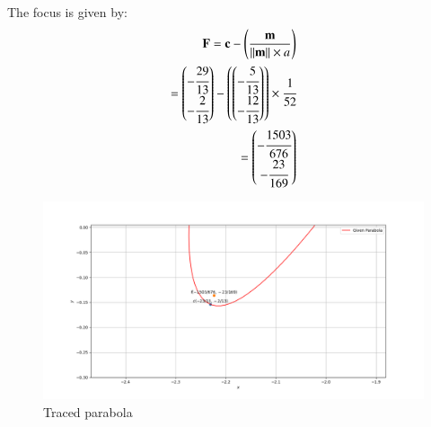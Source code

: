 \begin{enumerate}
The focus is given by:
\begin{align}
\mathbf{F}=\mathbf{c}-
\left(
\frac
{
\mathbf{m}
}
{
\left\lVert
\mathbf{m}
\right\rVert
\times a
}
\right)
\\
=\begin{pmatrix}
-\cfrac{29}{13}
\\
-\cfrac{2}{13}
\end{pmatrix}
-\begin{pmatrix}
\begin{pmatrix}
-\cfrac{5}{13}
\\
-\cfrac{12}{13}
\end{pmatrix}
\end{pmatrix}
\times \cfrac{1}{52}\\
=\begin{pmatrix}
-\cfrac{1503}{676}
\\
-\cfrac{23}{169}
\end{pmatrix}
\end{align}

\begin{figure}[!ht]
    \centering
    \includegraphics[width=\columnwidth]{./solutions/41/7/figs/parabola}
\caption{Traced parabola}
\label{eq:solutions/41/7/parabola}
\end{figure}

\end{enumerate}



